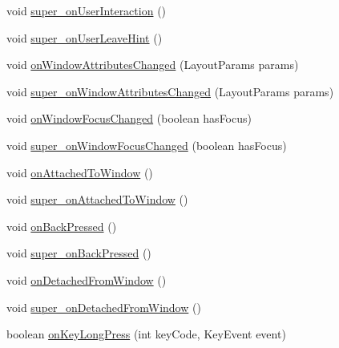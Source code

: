 \begin{DoxyCompactItemize}
void \hyperlink{classorg_1_1qtproject_1_1qt5_1_1android_1_1bindings_1_1_qt_activity_a706d78309b31669959a98b46952de75c}{super\+\_\+on\+User\+Interaction} ()
\item 
void \hyperlink{classorg_1_1qtproject_1_1qt5_1_1android_1_1bindings_1_1_qt_activity_ae71ad183d13c1bbb1fd1dccee12dde24}{super\+\_\+on\+User\+Leave\+Hint} ()
\item 
void \hyperlink{classorg_1_1qtproject_1_1qt5_1_1android_1_1bindings_1_1_qt_activity_af881fa829fb552af632f8b1bba96f351}{on\+Window\+Attributes\+Changed} (Layout\+Params params)
\item 
void \hyperlink{classorg_1_1qtproject_1_1qt5_1_1android_1_1bindings_1_1_qt_activity_aa510558df5227f66d81d6119389e7886}{super\+\_\+on\+Window\+Attributes\+Changed} (Layout\+Params params)
\item 
void \hyperlink{classorg_1_1qtproject_1_1qt5_1_1android_1_1bindings_1_1_qt_activity_ab161d356ebf5044a00182ffaf79d3437}{on\+Window\+Focus\+Changed} (boolean has\+Focus)
\item 
void \hyperlink{classorg_1_1qtproject_1_1qt5_1_1android_1_1bindings_1_1_qt_activity_a3d01ed848c426f937fe18214ff006931}{super\+\_\+on\+Window\+Focus\+Changed} (boolean has\+Focus)
\item 
void \hyperlink{classorg_1_1qtproject_1_1qt5_1_1android_1_1bindings_1_1_qt_activity_a052fd4aee0de52bcf2d8a10c5671d586}{on\+Attached\+To\+Window} ()
\item 
void \hyperlink{classorg_1_1qtproject_1_1qt5_1_1android_1_1bindings_1_1_qt_activity_a7155f32de8ac1f383e18250f28cd1f97}{super\+\_\+on\+Attached\+To\+Window} ()
\item 
void \hyperlink{classorg_1_1qtproject_1_1qt5_1_1android_1_1bindings_1_1_qt_activity_a593eeb49762865051c6348a6b98e7ff1}{on\+Back\+Pressed} ()
\item 
void \hyperlink{classorg_1_1qtproject_1_1qt5_1_1android_1_1bindings_1_1_qt_activity_a84b318d75dea61b3aa2743fb475c90da}{super\+\_\+on\+Back\+Pressed} ()
\item 
void \hyperlink{classorg_1_1qtproject_1_1qt5_1_1android_1_1bindings_1_1_qt_activity_aa7cad0cee8c325c1cbd7bb77a8a2c5ce}{on\+Detached\+From\+Window} ()
\item 
void \hyperlink{classorg_1_1qtproject_1_1qt5_1_1android_1_1bindings_1_1_qt_activity_a103cd6d406de520a7c30fa31a704ee11}{super\+\_\+on\+Detached\+From\+Window} ()
\item 
boolean \hyperlink{classorg_1_1qtproject_1_1qt5_1_1android_1_1bindings_1_1_qt_activity_ad1c024d3096ee30566b083bf35b711f4}{on\+Key\+Long\+Press} (int key\+Code, Key\+Event event)

\end{DoxyCompactItemize}
